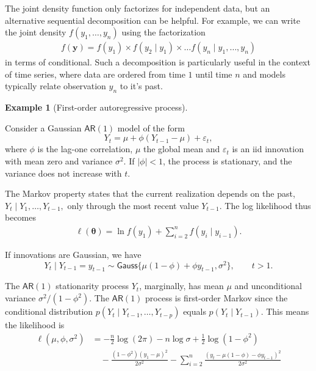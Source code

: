 \documentclass[
  11pt,
  letterpaper,
]{scrbook}
\theoremstyle{definition}
\theoremstyle{plain}
\theoremstyle{plain}
\theoremstyle{definition}
\newtheorem{example}{Example}[chapter]
\theoremstyle{definition}
\theoremstyle{remark}
\begin{document}
The joint density function only factorizes for independent data, but an
alternative sequential decomposition can be helpful. For example, we can
write the joint density \(f(y_1, \ldots, y_n)\) using the factorization
\begin{align*}
f(\boldsymbol{y}) = f(y_1) \times f(y_2 \mid y_1) \times \ldots f(y_n \mid y_1, \ldots, y_n)
\end{align*} in terms of conditional. Such a decomposition is
particularly useful in the context of time series, where data are
ordered from time \(1\) until time \(n\) and models typically relate
observation \(y_n\) to it's past.

\begin{example}[First-order autoregressive
process]\protect\hypertarget{exm-autoregressive-one}{}\label{exm-autoregressive-one}

Consider a Gaussian \(\mathsf{AR}(1)\) model of the form
\[Y_t = \mu + \phi(Y_{t-1} - \mu) + \varepsilon_t,\] where \(\phi\) is
the lag-one correlation, \(\mu\) the global mean and \(\varepsilon_t\)
is an iid innovation with mean zero and variance \(\sigma^2\). If
\(|\phi| < 1\), the process is stationary, and the variance does not
increase with \(t\).

The Markov property states that the current realization depends on the
past, \(Y_t \mid Y_1, \ldots, Y_{t-1},\) only through the most recent
value \(Y_{t-1}.\) The log likelihood thus becomes \begin{align*}
\ell(\boldsymbol{\theta}) = \ln f(y_1) + \sum_{i=2}^n f(y_i \mid y_{i-1}).
\end{align*}

If innovations are Gaussian, we have
\[Y_t \mid Y_{t-1}=y_{t-1} \sim \mathsf{Gauss}\{\mu(1-\phi)+ \phi y_{t-1}, \sigma^2\}, \qquad t>1.\]

The \(\mathsf{AR}(1)\) stationarity process \(Y_t\), marginally, has
mean \(\mu\) and unconditional variance \(\sigma^2/(1-\phi^2)\). The
\(\mathsf{AR}(1)\) process is first-order Markov since the conditional
distribution \(p(Y_t \mid Y_{t-1}, \ldots, Y_{t-p})\) equals
\(p(Y_t \mid Y_{t-1})\). This means the likelihood is \begin{align*}
\ell(\mu, \phi,\sigma^2)& = -\frac{n}{2}\log(2\pi) - n\log \sigma + \frac{1}{2}\log(1-\phi^2) \\&\quad -\frac{(1-\phi^2)(y_1- \mu)^2}{2\sigma^2} - \sum_{i=2}^n \frac{(y_t - \mu(1-\phi)- \phi y_{t-1})^2}{2\sigma^2}
\end{align*}

\end{example}
\end{document}
